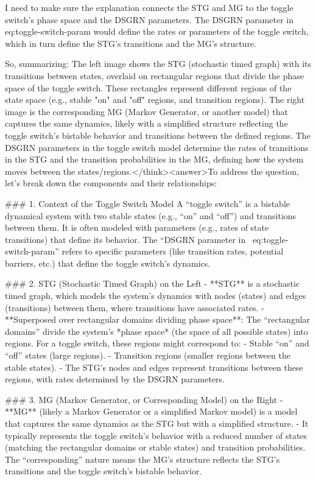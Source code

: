 I need to make sure the explanation connects the STG and MG to the toggle switch's phase space and the DSGRN parameters. The DSGRN parameter in eq:toggle-switch-param would define the rates or parameters of the toggle switch, which in turn define the STG's transitions and the MG's structure.

So, summarizing: The left image shows the STG (stochastic timed graph) with its transitions between states, overlaid on rectangular regions that divide the phase space of the toggle switch. These rectangles represent different regions of the state space (e.g., stable "on" and "off" regions, and transition regions). The right image is the corresponding MG (Markov Generator, or another model) that captures the same dynamics, likely with a simplified structure reflecting the toggle switch's bistable behavior and transitions between the defined regions. The DSGRN parameters in the toggle switch model determine the rates of transitions in the STG and the transition probabilities in the MG, defining how the system moves between the states/regions.</think><answer>To address the question, let’s break down the components and their relationships:  


### 1. Context of the Toggle Switch Model  
A “toggle switch” is a bistable dynamical system with two stable states (e.g., “on” and “off”) and transitions between them. It is often modeled with parameters (e.g., rates of state transitions) that define its behavior. The “DSGRN parameter in ~eq:toggle-switch-param” refers to specific parameters (like transition rates, potential barriers, etc.) that define the toggle switch’s dynamics.  


### 2. STG (Stochastic Timed Graph) on the Left  
- **STG** is a stochastic timed graph, which models the system’s dynamics with nodes (states) and edges (transitions) between them, where transitions have associated rates.  
- **Superposed over rectangular domains dividing phase space**: The “rectangular domains” divide the system’s *phase space* (the space of all possible states) into regions. For a toggle switch, these regions might correspond to:  
  - Stable “on” and “off” states (large regions).  
  - Transition regions (smaller regions between the stable states).  
- The STG’s nodes and edges represent transitions between these regions, with rates determined by the DSGRN parameters.  


### 3. MG (Markov Generator, or Corresponding Model) on the Right  
- **MG** (likely a Markov Generator or a simplified Markov model) is a model that captures the same dynamics as the STG but with a simplified structure.  
- It typically represents the toggle switch’s behavior with a reduced number of states (matching the rectangular domains or stable states) and transition probabilities. The “corresponding” nature means the MG’s structure reflects the STG’s transitions and the toggle switch’s bistable behavior.  



